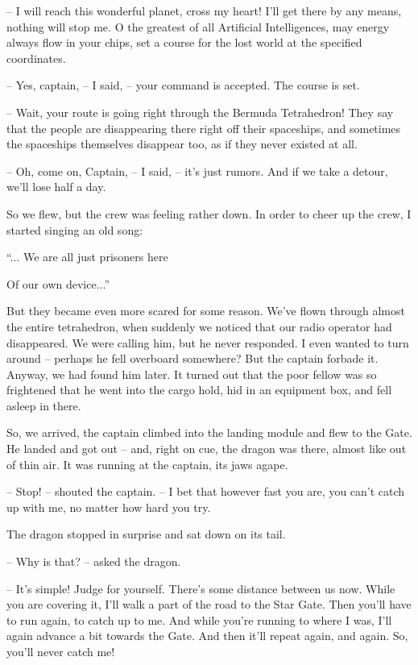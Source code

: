 \documentclass[ebook,oneside,final,openright]{memoir}
\begin{document}
– I will reach this wonderful planet, cross my heart! I’ll get there by any means, nothing will stop me. O the greatest of all Artificial Intelligences, may energy always flow in your chips, set a course for the lost world at the specified coordinates.\par
– Yes, captain, – I said, – your command is accepted. The course is set.\par
– Wait, your route is going right through the Bermuda Tetrahedron! They say that the people are disappearing there right off their spaceships, and sometimes the spaceships themselves disappear too, as if they never existed at all.\par
– Oh, come on, Captain, – I said, – it’s just rumors. And if we take a detour, we’ll lose half a day.\par
\par
So we flew, but the crew was feeling rather down. In order to cheer up the crew, I started singing an old song: \par
 “... We are all just prisoners here \par
 Of our own device...” \par
 But they became even more scared for some reason. We’ve flown through almost the entire tetrahedron, when suddenly we noticed that our radio operator had disappeared. We were calling him, but he never responded. I even wanted to turn around – perhaps he fell overboard somewhere? But the captain forbade it. Anyway, we had found him later. It turned out that the poor fellow was so frightened that he went into the cargo hold, hid in an equipment box, and fell asleep in there.\par
\par
So, we arrived, the captain climbed into the landing module and flew to the Gate. He landed and got out – and, right on cue, the dragon was there, almost like out of thin air. It was running at the captain, its jaws agape.\par
– Stop! – shouted the captain. – I bet that however fast you are, you can’t catch up with me, no matter how hard you try.\par
The dragon stopped in surprise and sat down on its tail.\par
– Why is that? – asked the dragon.\par
– It’s simple! Judge for yourself. There’s some distance between us now. While you are covering it, I’ll walk a part of the road to the Star Gate. Then you’ll have to run again, to catch up to me. And while you’re running to where I was, I’ll again advance a bit towards the Gate. And then it’ll repeat again, and again. So, you’ll never catch me!\par
\end{document}
